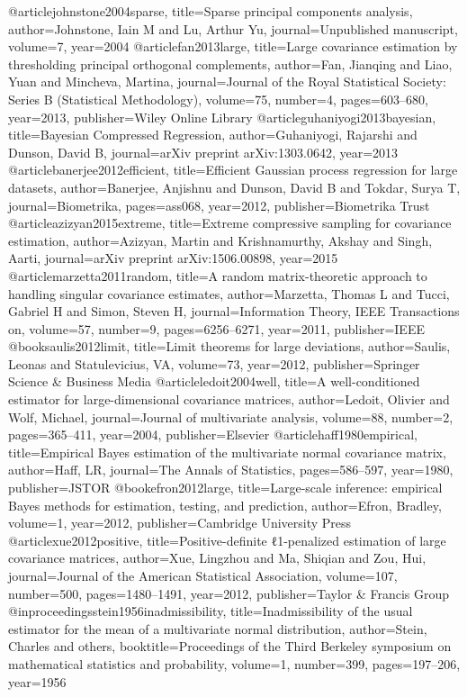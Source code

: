 @article{johnstone2004sparse,
  title={Sparse principal components analysis},
  author={Johnstone, Iain M and Lu, Arthur Yu},
  journal={Unpublished manuscript},
  volume={7},
  year={2004}
}
@article{fan2013large,
  title={Large covariance estimation by thresholding principal orthogonal complements},
  author={Fan, Jianqing and Liao, Yuan and Mincheva, Martina},
  journal={Journal of the Royal Statistical Society: Series B (Statistical Methodology)},
  volume={75},
  number={4},
  pages={603--680},
  year={2013},
  publisher={Wiley Online Library}
}
@article{guhaniyogi2013bayesian,
  title={Bayesian Compressed Regression},
  author={Guhaniyogi, Rajarshi and Dunson, David B},
  journal={arXiv preprint arXiv:1303.0642},
  year={2013}
}
@article{banerjee2012efficient,
  title={Efficient Gaussian process regression for large datasets},
  author={Banerjee, Anjishnu and Dunson, David B and Tokdar, Surya T},
  journal={Biometrika},
  pages={ass068},
  year={2012},
  publisher={Biometrika Trust}
}
@article{azizyan2015extreme,
  title={Extreme compressive sampling for covariance estimation},
  author={Azizyan, Martin and Krishnamurthy, Akshay and Singh, Aarti},
  journal={arXiv preprint arXiv:1506.00898},
  year={2015}
}
@article{marzetta2011random,
  title={A random matrix-theoretic approach to handling singular covariance estimates},
  author={Marzetta, Thomas L and Tucci, Gabriel H and Simon, Steven H},
  journal={Information Theory, IEEE Transactions on},
  volume={57},
  number={9},
  pages={6256--6271},
  year={2011},
  publisher={IEEE}
}
@book{saulis2012limit,
  title={Limit theorems for large deviations},
  author={Saulis, Leonas and Statulevicius, VA},
  volume={73},
  year={2012},
  publisher={Springer Science \& Business Media}
}
@article{ledoit2004well,
  title={A well-conditioned estimator for large-dimensional covariance matrices},
  author={Ledoit, Olivier and Wolf, Michael},
  journal={Journal of multivariate analysis},
  volume={88},
  number={2},
  pages={365--411},
  year={2004},
  publisher={Elsevier}
}
@article{haff1980empirical,
  title={Empirical Bayes estimation of the multivariate normal covariance matrix},
  author={Haff, LR},
  journal={The Annals of Statistics},
  pages={586--597},
  year={1980},
  publisher={JSTOR}
}
@book{efron2012large,
  title={Large-scale inference: empirical Bayes methods for estimation, testing, and prediction},
  author={Efron, Bradley},
  volume={1},
  year={2012},
  publisher={Cambridge University Press}
}
@article{xue2012positive,
  title={Positive-definite ℓ1-penalized estimation of large covariance matrices},
  author={Xue, Lingzhou and Ma, Shiqian and Zou, Hui},
  journal={Journal of the American Statistical Association},
  volume={107},
  number={500},
  pages={1480--1491},
  year={2012},
  publisher={Taylor \& Francis Group}
}
 @inproceedings{stein1956inadmissibility,
  title={Inadmissibility of the usual estimator for the mean of a multivariate normal distribution},
  author={Stein, Charles and others},
  booktitle={Proceedings of the Third Berkeley symposium on mathematical statistics and probability},
  volume={1},
  number={399},
  pages={197--206},
  year={1956}
}